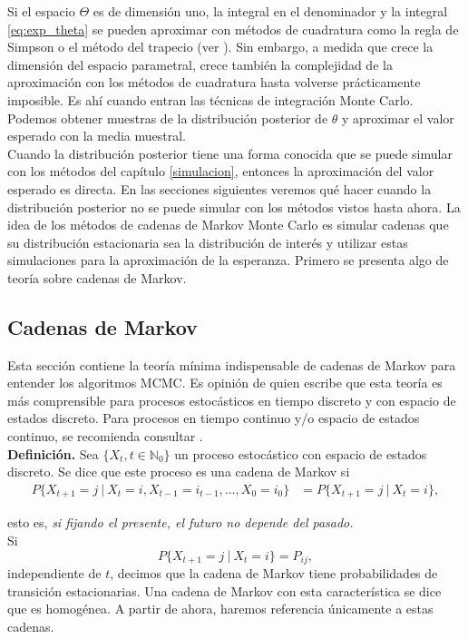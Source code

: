 \documentclass[11pt,a4paper]{article}
\begin{document}
Si el espacio $\Theta$ es de dimensión uno, la integral en el denominador y la integral \eqref{eq:exp_theta} se pueden aproximar con métodos de cuadratura como la regla de Simpson o el método del trapecio (ver \citet{burden}). Sin embargo, a medida que crece la dimensión del espacio parametral, crece también la complejidad de la aproximación con los métodos de cuadratura hasta volverse prácticamente imposible. Es ahí cuando entran las técnicas de integración Monte Carlo. Podemos obtener muestras de la distribución posterior de $\theta$ y aproximar el valor esperado con la media muestral.\\

Cuando la distribución posterior tiene una forma conocida que se puede simular con los métodos del capítulo \ref{simulacion}, entonces la aproximación del valor esperado es directa. En las secciones siguientes veremos qué hacer cuando la distribución posterior no se puede simular con los métodos vistos hasta ahora. La idea de los métodos de cadenas de Markov Monte Carlo es simular cadenas que su distribución estacionaria sea la distribución de interés y utilizar estas simulaciones para la aproximación de la esperanza. Primero se presenta algo de teoría sobre cadenas de Markov.\\

\subsection{Cadenas de Markov}
Esta sección contiene la teoría mínima indispensable de cadenas de Markov para entender los algoritmos MCMC. Es opinión de quien escribe que esta teoría es más comprensible para procesos estocásticos en tiempo discreto y con espacio de estados discreto. Para procesos en tiempo continuo y/o espacio de estados continuo, se recomienda consultar \citet{ross}.\\

\textbf{Definición.} Sea $\lbrace X_t, t \in \mathbb{N}_0\rbrace$ un proceso estocástico con espacio de estados discreto. Se dice que este proceso es una cadena de Markov si 
\begin{align*}
P\lbrace X_{t+1} = j \ | \ X_t = i, X_{t-1} = i_{t-1}, \dots, X_0 = i_0\rbrace &= P\lbrace X_{t+1} = j \ | \ X_t = i\rbrace,
\end{align*}

esto es, \textit{si fijando el presente, el futuro no depende del pasado.}\\

Si $$P\lbrace X_{t+1} = j \ | \ X_t = i\rbrace = P_{ij},$$ independiente de $t$, decimos que la cadena de Markov tiene probabilidades de transición estacionarias. Una cadena de Markov con esta característica se dice que es homogénea. A partir de ahora, haremos referencia únicamente a estas cadenas.\\
\end{document}
